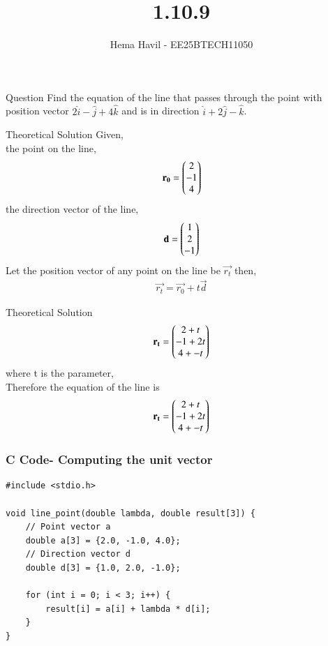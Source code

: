 \documentclass{beamer}
\title %
{1.10.9}
\author %
{Hema Havil - EE25BTECH11050}
\begin{document}
	
	\frame{\titlepage}
	\begin{frame}{Question}
		 Find the equation of the line that passes through the point with position vector
        $2\hat{i}-\hat{j}+4\hat{k}$ and is in direction $\hat{i}+2\hat{j}-\hat{k}$.
	\end{frame}

	
\begin{frame}{Theoretical Solution}
	Given,\\
         the point on the line,
         \begin{align}
             \mathbf{r_0}=\begin{pmatrix}2\\-1\\4\end{pmatrix}
         \end{align}
         the direction vector of the line,
         \begin{align}
             \mathbf{d}=\begin{pmatrix}1\\2\\-1\end{pmatrix}
         \end{align}
         Let the position vector of any point on the line be $\vec{r_t}$ then,
         \begin{align}
             \vec{r_t}=\vec{r_0}+t\vec{d}
         \end{align}
\end{frame}
\begin{frame}{Theoretical Solution}
\begin{align}
             \mathbf{r_t}=\begin{pmatrix}2+t\\-1+2t\\4+-t\end{pmatrix}
         \end{align}
         where t is the parameter,\\
         Therefore the equation of the line is 
         \begin{align}
             \mathbf{r_t}=\begin{pmatrix}2+t\\-1+2t\\4+-t\end{pmatrix}
         \end{align}
\end{frame}
	
	\begin{frame}[fragile]
	\frametitle{C Code- Computing the unit vector}
	
	\begin{lstlisting}
#include <stdio.h>

void line_point(double lambda, double result[3]) {
    // Point vector a
    double a[3] = {2.0, -1.0, 4.0};
    // Direction vector d
    double d[3] = {1.0, 2.0, -1.0};

    for (int i = 0; i < 3; i++) {
        result[i] = a[i] + lambda * d[i];
    }
}

	\end{lstlisting}
\end{frame}
\end{document}
